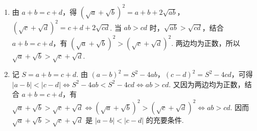 \begin{solution}
\begin{enumerate}
\item 由 \(a+b=c+d\)，得 \((\sqrt a+\sqrt b)^2=a+b+2\sqrt{ab}\)，\((\sqrt c+\sqrt d)^2=c+d+2\sqrt{cd}\). 当 \(ab>cd\) 时，\(\sqrt{ab}>\sqrt{cd}\)，结合 \(a+b=c+d\)，有 \((\sqrt a+\sqrt b)^2>(\sqrt c+\sqrt d)^2\). 两边均为正数，所以 \(\sqrt a+\sqrt b>\sqrt c+\sqrt d\).
\item 记 \(S=a+b=c+d\). 由 \((a-b)^2=S^2-4ab\)，\((c-d)^2=S^2-4cd\)，可得 \(|a-b|<|c-d|\Longleftrightarrow S^2-4ab<S^2-4cd\Longleftrightarrow ab>cd\). 又因为两边均为正数，结合 \(a+b=c+d\)，有
\(\sqrt a+\sqrt b>\sqrt c+\sqrt d\Longleftrightarrow(\sqrt a+\sqrt b)^2>(\sqrt c+\sqrt d)^2\Longleftrightarrow ab>cd\). 因而 \(\sqrt a+\sqrt b>\sqrt c+\sqrt d\) 是 \(|a-b|<|c-d|\) 的充要条件.
\end{enumerate}
\end{solution}
